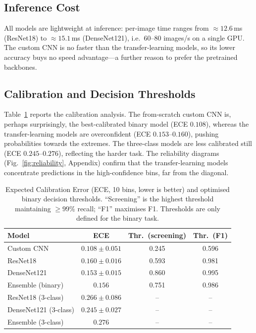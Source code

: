 \documentclass[runningheads]{llncs}
\begin{document}
\subsection{Inference Cost}

All models are lightweight at inference: per-image time ranges from
$\approx12.6$\,ms (ResNet18) to $\approx15.1$\,ms (DenseNet121), i.e.\
$60$--$80$ images/s on a single GPU. The custom CNN is no faster than the
transfer-learning models, so its lower accuracy buys no speed advantage---a
further reason to prefer the pretrained backbones.

\subsection{Calibration and Decision Thresholds}\label{sec:calib}

Table~\ref{tab:calibration} reports the calibration analysis. The
from-scratch custom CNN is, perhaps surprisingly, the best-calibrated binary
model (ECE $0.108$), whereas the transfer-learning models are overconfident
(ECE $0.153$--$0.160$), pushing probabilities towards the extremes. The
three-class models are less calibrated still (ECE $0.245$--$0.276$),
reflecting the harder task. The reliability diagrams
(Fig.~\ref{fig:reliability}, Appendix) confirm that the transfer-learning
models concentrate predictions in the high-confidence bins, far from the
diagonal.

\begin{table}[!ht]
\caption{Expected Calibration Error (ECE, 10 bins, lower is better) and
optimised binary decision thresholds. ``Screening'' is the highest
threshold maintaining $\geq99\%$ recall; ``F1'' maximises F1. Thresholds
are only defined for the binary task.}
\label{tab:calibration}
\centering
\setlength{\tabcolsep}{6pt}
\begin{tabular}{lccc}
\toprule
Model & ECE & Thr.\ (screening) & Thr.\ (F1) \\
\midrule
Custom CNN              & $0.108\pm0.051$ & 0.245 & 0.596 \\
ResNet18                & $0.160\pm0.016$ & 0.593 & 0.981 \\
DenseNet121             & $0.153\pm0.015$ & 0.860 & 0.995 \\
Ensemble (binary)       & $0.156$         & 0.751 & 0.986 \\
ResNet18 (3-class)      & $0.266\pm0.086$ & --    & --    \\
DenseNet121 (3-class)   & $0.245\pm0.027$ & --    & --    \\
Ensemble (3-class)      & $0.276$         & --    & --    \\
\bottomrule
\end{tabular}
\end{table}
\end{document}

